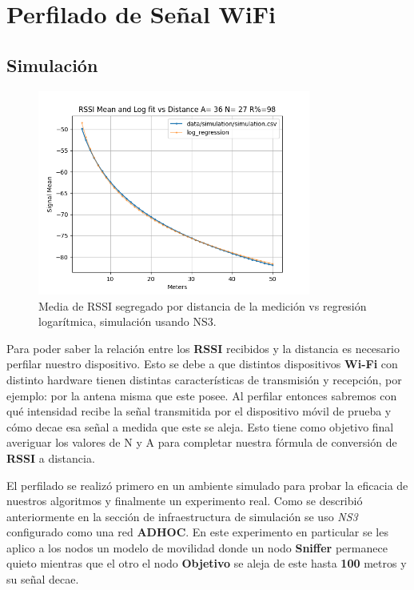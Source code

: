 \chapter{Perfilado de Señal WiFi}


\section{Simulación}
\begin{figure}[!htb]
	\centering
\includegraphics[width=0.8\textwidth]{Figuras/profiling/simulation/simulation_mean_fit.png}
	\captionsetup{margin=2cm}
 	\caption[Media de RSSI segregado por distancia de la medición vs regresión logarítmica, simulación usando NS3.]{Media de RSSI segregado por distancia de la medición vs regresión logarítmica, simulación usando NS3.}
	\label{fig:profiling-result-sim}
\end{figure}


Para poder saber la relación entre los \textbf{RSSI} recibidos y la distancia es necesario perfilar nuestro dispositivo. Esto se debe a que distintos dispositivos \textbf{Wi-Fi} con distinto hardware tienen distintas características de transmisión y recepción, por ejemplo: por la antena misma que este posee. Al perfilar entonces sabremos con qué intensidad recibe la señal transmitida por el dispositivo móvil de prueba y cómo decae esa señal a medida que este se aleja. Esto tiene como objetivo final averiguar los valores de N y A para completar nuestra fórmula de conversión de \textbf{RSSI} a distancia.

El perfilado se realizó primero en un ambiente simulado para probar la eficacia de nuestros algoritmos y finalmente un experimento real.
Como se describió anteriormente en la sección de infraestructura de simulación se uso \textit{NS3} configurado como una red \textbf{ADHOC}. En este experimento en particular se les aplico a los nodos un modelo de movilidad donde un nodo \textbf{Sniffer} permanece quieto mientras que el otro el nodo \textbf{Objetivo} se aleja de este hasta \textbf{100} metros y su señal decae.


